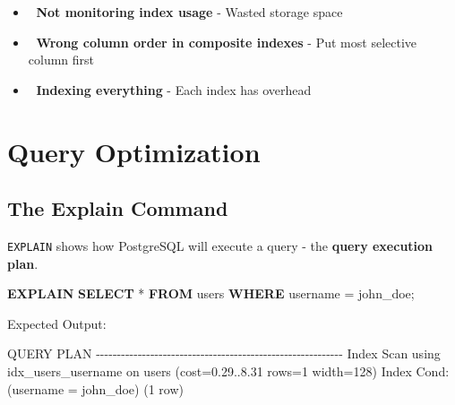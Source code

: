 \documentclass[
]{report}
\newenvironment{Shaded}{\begin{snugshade}}{\end{snugshade}}
\newcommand{\KeywordTok}[1]{\textcolor[rgb]{0.00,0.23,0.31}{\textbf{#1}}}
\newcommand{\NormalTok}[1]{\textcolor[rgb]{0.00,0.23,0.31}{#1}}
\newcommand{\OperatorTok}[1]{\textcolor[rgb]{0.37,0.37,0.37}{#1}}
\newcommand{\StringTok}[1]{\textcolor[rgb]{0.13,0.47,0.30}{#1}}
\providecommand{\tightlist}{%
  \setlength{\itemsep}{0pt}\setlength{\parskip}{0pt}}\usepackage{longtable,booktabs,array}
\begin{document}
\begin{itemize}
\tightlist
\item
  🚫 \textbf{Not monitoring index usage} - Wasted storage space
\end{itemize}

\begin{itemize}
\tightlist
\item
  🚫 \textbf{Wrong column order in composite indexes} - Put most
  selective column first
\end{itemize}

\begin{itemize}
\tightlist
\item
  🚫 \textbf{Indexing everything} - Each index has overhead
\end{itemize}

\chapter{Query Optimization}\label{query-optimization}

\section{The Explain Command}\label{the-explain-command}

\texttt{EXPLAIN} shows how PostgreSQL will execute a query - the
\textbf{query execution plan}.

\begin{Shaded}
\begin{Highlighting}[]
\KeywordTok{EXPLAIN}
\KeywordTok{SELECT} \OperatorTok{*} \KeywordTok{FROM}\NormalTok{ users }\KeywordTok{WHERE}\NormalTok{ username }\OperatorTok{=} \StringTok{\textquotesingle{}john\_doe\textquotesingle{}}\NormalTok{;}
\end{Highlighting}
\end{Shaded}

Expected Output:

\begin{Shaded}
\begin{Highlighting}[]
\NormalTok{                        QUERY PLAN}
\NormalTok{{-}{-}{-}{-}{-}{-}{-}{-}{-}{-}{-}{-}{-}{-}{-}{-}{-}{-}{-}{-}{-}{-}{-}{-}{-}{-}{-}{-}{-}{-}{-}{-}{-}{-}{-}{-}{-}{-}{-}{-}{-}{-}{-}{-}{-}{-}{-}{-}{-}{-}{-}{-}{-}{-}{-}{-}{-}{-}{-}}
\NormalTok{ Index Scan using idx\_users\_username on users  (cost=0.29..8.31}
\NormalTok{  rows=1 width=128)}
\NormalTok{    Index Cond: (username = \textquotesingle{}john\_doe\textquotesingle{})}
\NormalTok{(1 row)}
\end{Highlighting}
\end{Shaded}
\end{document}
